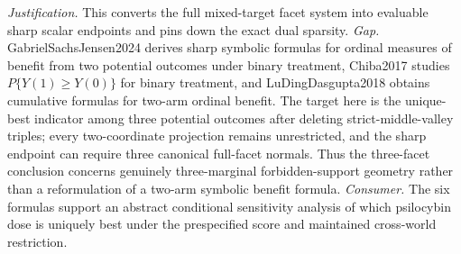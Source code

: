 \documentclass{article}
\begin{document}
\par\smallskip\noindent \textit{Justification.} This converts the full mixed-target facet system into evaluable sharp scalar endpoints and pins down the exact dual sparsity. \textit{Gap.} GabrielSachsJensen2024 derives sharp symbolic formulas for ordinal measures of benefit from two potential outcomes under binary treatment, Chiba2017 studies \(P\{Y(1)\ge Y(0)\}\) for binary treatment, and LuDingDasgupta2018 obtains cumulative formulas for two-arm ordinal benefit. The target here is the unique-best indicator among three potential outcomes after deleting strict-middle-valley triples; every two-coordinate projection remains unrestricted, and the sharp endpoint can require three canonical full-facet normals. Thus the three-facet conclusion concerns genuinely three-marginal forbidden-support geometry rather than a reformulation of a two-arm symbolic benefit formula. \textit{Consumer.} The six formulas support an abstract conditional sensitivity analysis of which psilocybin dose is uniquely best under the prespecified score and maintained cross-world restriction.
\end{document}

